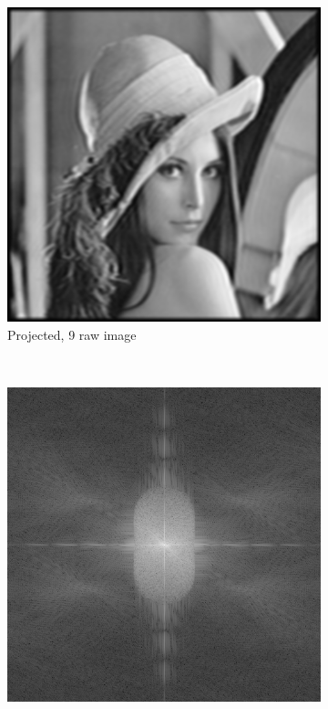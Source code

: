 \begin{figure}[h]
  \centering
  \begin{subfigure}[t]{0.23\textwidth}
      \centering
      \includegraphics[width=\textwidth]{sim_slit/recon/input}
      \caption{Projected, 9 raw image}
  \end{subfigure}~
  \begin{subfigure}[t]{0.23\textwidth}
      \centering
      \includegraphics[width=\textwidth]{sim_slit/recon/FFT_input}

\end{subfigure}
\end{figure}
